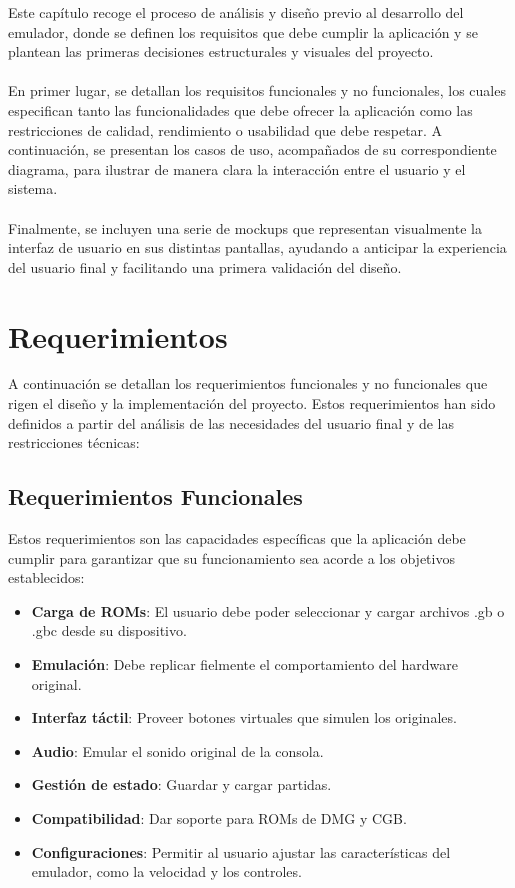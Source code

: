 Este capítulo recoge el proceso de análisis y diseño previo al desarrollo del emulador, donde se definen los requisitos que debe cumplir la aplicación y se plantean las primeras decisiones estructurales y visuales del proyecto.
\\\\
En primer lugar, se detallan los requisitos funcionales y no funcionales, los cuales especifican tanto las funcionalidades que debe ofrecer la aplicación como las restricciones de calidad, rendimiento o usabilidad que debe respetar. A continuación, se presentan los casos de uso, acompañados de su correspondiente diagrama, para ilustrar de manera clara la interacción entre el usuario y el sistema.
\\\\
Finalmente, se incluyen una serie de mockups que representan visualmente la interfaz de usuario en sus distintas pantallas, ayudando a anticipar la experiencia del usuario final y facilitando una primera validación del diseño.

\section{Requerimientos}

A continuación se detallan los requerimientos funcionales y no funcionales que rigen el diseño y la implementación del proyecto. Estos requerimientos han sido definidos a partir del análisis de las necesidades del usuario final y de las restricciones técnicas:

\subsection{Requerimientos Funcionales}

Estos requerimientos son las capacidades específicas que la aplicación debe cumplir para garantizar que su funcionamiento sea acorde a los objetivos establecidos:

\begin{itemize}
    \item \textbf{Carga de ROMs}: El usuario debe poder seleccionar y cargar archivos .gb o .gbc desde su dispositivo.
    \item \textbf{Emulación}: Debe replicar fielmente el comportamiento del hardware original.
    \item \textbf{Interfaz táctil}: Proveer botones virtuales que simulen los originales.
    \item \textbf{Audio}: Emular el sonido original de la consola.
    \item \textbf{Gestión de estado}: Guardar y cargar partidas.
    \item \textbf{Compatibilidad}: Dar soporte para ROMs de DMG y CGB.
    \item \textbf{Configuraciones}: Permitir al usuario ajustar las características del emulador, como la velocidad y los controles.
\end{itemize}

